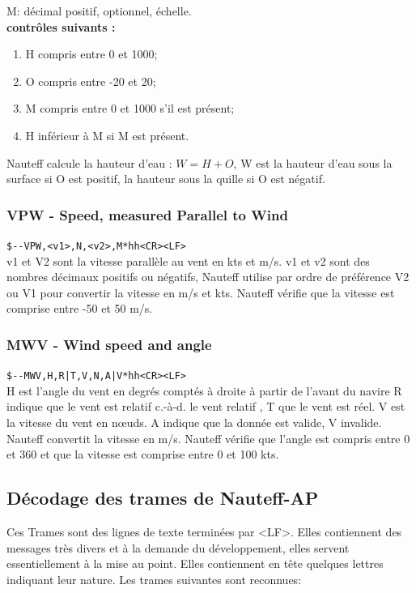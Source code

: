 \documentclass[a4paper,11pt]{report}
\begin{document}
M: décimal positif, optionnel, échelle.
\\
\textbf{ contrôles suivants :}
\begin{enumerate}
	\item H compris entre 0 et 1000;
	\item O compris entre -20 et 20;
	\item M compris entre 0 et 1000 s'il est présent;
	\item H inférieur à M si M est présent.
\end{enumerate}
Nauteff calcule la hauteur d'eau : \(W = H + O\), W est la hauteur d'eau sous la surface si O est positif, la hauteur sous la quille si O est négatif.


\subsubsection{VPW - Speed, measured Parallel to Wind}
\texttt{\${-}{-}VPW,<v1>,N,<v2>,M*hh<CR><LF>}
\\
v1 et V2 sont la vitesse parallèle au vent en kts et m/s.
v1 et v2 sont des nombres décimaux positifs ou négatifs,
Nauteff utilise par ordre de préférence V2 ou V1
pour convertir la vitesse en m/s et kts.
Nauteff vérifie que la vitesse est comprise entre -50 et 50 m/s.

\subsubsection{MWV - Wind speed and angle}
\texttt{\${-}{-}MWV,H,R|T,V,N,A|V*hh<CR><LF>}
\\
H est l'angle du vent en degrés comptés à droite à partir de l'avant du navire
R indique que le vent est relatif c.-à-d. le vent relatif , T que le vent est réel.
V est la vitesse du vent en nœuds.
A indique que la donnée est valide, V invalide.
Nauteff convertit la vitesse en m/s.
Nauteff vérifie que l'angle est compris entre 0 et 360 et que la vitesse est comprise entre 0 et 100 kts.


\subsection{Décodage des trames de Nauteff-AP}
Ces Trames sont des lignes de texte terminées par <LF>.
Elles contiennent des messages très divers et à la demande du développement,
elles servent essentiellement à la mise au point.
Elles contiennent en tête quelques lettres indiquant leur nature.
Les trames suivantes sont reconnues:
\end{document}
